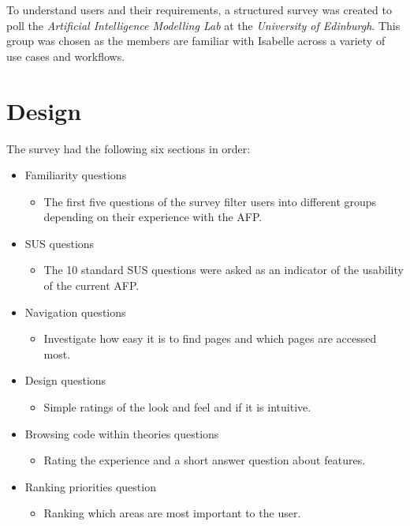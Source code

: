 \documentclass[bsc,frontabs,oneside,singlespacing,parskip,deptreport,logo]{infthesis}
\begin{document}
To understand users and their requirements, a structured survey was created to poll the \textit{Artificial Intelligence Modelling Lab} at the \textit{University of Edinburgh}. This group was chosen as the members are familiar with Isabelle across a variety of use cases and workflows.

\section{Design}

The survey had the following six sections in order: 

\begin{itemize}
  \item Familiarity questions
  \begin{itemize}
    \item The first five questions of the survey filter users into different groups depending on their experience with the AFP\@.
  \end{itemize}
  \item SUS questions
  \begin{itemize}
    \item The 10 standard SUS questions were asked as an indicator of the usability of the current AFP\@. 
  \end{itemize}
  \item Navigation questions
  \begin{itemize}
    \item Investigate how easy it is to find pages and which pages are accessed most.
  \end{itemize}
  \item Design questions
  \begin{itemize}
    \item Simple ratings of the look and feel and if it is intuitive.
  \end{itemize}
  \item Browsing code within theories questions
  \begin{itemize}
    \item Rating the experience and a short answer question about features.
  \end{itemize}
  \item Ranking priorities question
  \begin{itemize}
    \item Ranking which areas are most important to the user.
  \end{itemize}
\end{itemize}
\end{document}
